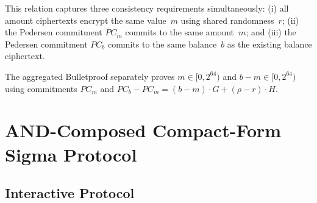 \documentclass[11pt]{article}
\theoremstyle{definition}
\begin{document}
This relation captures three consistency requirements simultaneously:
(i) all amount ciphertexts encrypt the same value~$m$ using shared
randomness~$r$;
(ii) the Pedersen commitment $\mathit{PC}_m$ commits to the same
amount~$m$;
and (iii) the Pedersen commitment $\mathit{PC}_b$ commits to the same
balance~$b$ as the existing balance ciphertext.

The aggregated Bulletproof separately proves $m \in [0, 2^{64})$ and
$b - m \in [0, 2^{64})$ using commitments $\mathit{PC}_m$ and
$\mathit{PC}_b - \mathit{PC}_m = (b - m) \cdot G + (\rho - r) \cdot H$.

\section{AND-Composed Compact-Form Sigma Protocol}
\label{sec:protocol}

\subsection{Interactive Protocol}
\label{sec:interactive}
\end{document}
